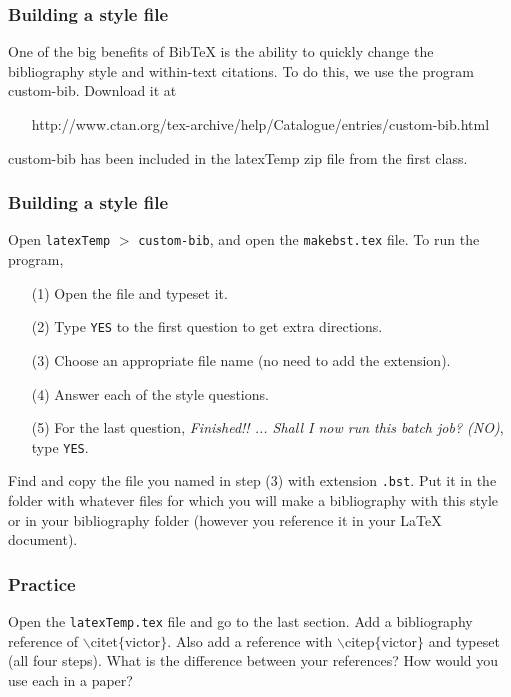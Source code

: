 \begin{frame}  \frametitle{Building a style file}
	One of the big benefits of BibTeX is the ability to quickly change the bibliography style and within-text citations. To do this, we use the program {\color{highlight}custom-bib}. Download it at
	\begin{itemize}\small 
		\item[] \color{highlight} http://www.ctan.org/tex-archive/help/Catalogue/entries/custom-bib.html
	\end{itemize}
	custom-bib has been included in the {\color{highlight}latexTemp} zip file from the first class.
\end{frame}

\begin{frame}  \frametitle{Building a style file}
	Open \texttt{latexTemp} $>$ \texttt{custom-bib}, and open the \texttt{\color{highlight}makebst.tex} file. To run the program,
	\begin{itemize}
		\item[(1)] Open the file and typeset it.
		\item[(2)] Type \texttt{YES} to the first question to get extra directions.
		\item[(3)] Choose an appropriate file name (no need to add the extension).
		\item[(4)] Answer each of the style questions.
		\item[(5)] For the last question, \textit{Finished!! ...  Shall I now run this batch job? (NO)}, type \texttt{YES}.
	\end{itemize}
	Find and copy the file you named in step (3) with extension \texttt{.bst}. Put it in the folder with whatever files for which you will make a bibliography with this style or in your bibliography folder (however you reference it in your LaTeX document).
\end{frame}

\begin{frame}  \frametitle{Practice}
	Open the \texttt{\color{highlight}latexTemp.tex} file and go to the last section. Add a bibliography reference of {\color{command}$\backslash$citet}{\color{braces}$\{${\color{black}victor}$\}$}. Also add a reference with {\color{command}$\backslash$citep}{\color{braces}$\{${\color{black}victor}$\}$} and typeset (all four steps). What is the difference between your references? How would you use each in a paper?
\end{frame}



